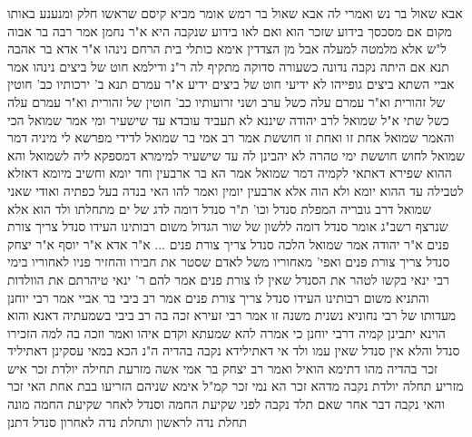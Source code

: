 \documentclass[12pt, openany]{book}
\begin{document}
{אבא שאול בר נש ואמרי לה אבא שאול בר רמש אומר  מביא קיסם שראשו חלק ומנענע באותו מקום  אם מסכסך בידוע שזכר הוא ואם לאו בידוע שנקבה היא 
א"ר נחמן אמר רבה בר אבוה ל"ש אלא מלמטה למעלה אבל מן הצדדין אימא  כותלי בית הרחם נינהו 
א"ר אדא בר אהבה  תנא אם היתה נקבה נדונה כשעורה סדוקה  מתקיף לה ר"נ  ודילמא חוט של ביצים נינהו  אמר אביי  השתא ביצים גופייהו לא ידיעי חוט של ביצים ידיע 
א"ר עמרם תנא  ב' ירכותיו כב' חוטין של זהורית  וא"ר עמרם עלה  כשל ערב  ושני זרועותיו כב' חוטין של זהורית וא"ר עמרם עלה  כשל שתי 
א"ל שמואל לרב יהודה  שיננא לא תעביד עובדא עד שישעיר  ומי אמר שמואל הכי  והאמר שמואל  אחת זו ואחת זו חוששת 
אמר רב אמי בר שמואל לדידי מפרשא לי מיניה דמר שמואל  לחוש חוששת ימי טהרה לא יהבינן לה עד שישעיר 
למימרא דמספקא ליה לשמואל  והא ההוא שפירא דאתאי לקמיה דמר שמואל  אמר  הא בר ארבעין וחד יומא וחשיב מיומא דאזלא לטבילה עד ההוא יומא ולא הוה אלא ארבעין יומין
ואמר להו  האי בנדה בעל  כפתיה ואודי  שאני שמואל דרב גובריה
המפלת סנדל וכו' ת"ר סנדל דומה לדג של ים מתחלתו ולד הוא אלא שנרצף  רשב"ג אומר  סנדל דומה ללשון של שור הגדול  משום רבותינו העידו  סנדל צריך צורת פנים 
א"ר יהודה אמר שמואל  הלכה סנדל צריך צורת פנים ... א"ר אדא א"ר יוסף א"ר יצחק  סנדל צריך צורת פנים ואפי' מאחוריו  משל לאדם שסטר את חבירו והחזיר פניו לאחוריו 
בימי רבי ינאי בקשו לטהר את הסנדל שאין לו צורת פנים אמר להם ר' ינאי  טיהרתם את הוולדות 
והתניא משום רבותינו העידו  סנדל צריך צורת פנים אמר רב ביבי בר אביי אמר רבי יוחנן  מעדותו של רבי נחוניא נשנית משנה זו  אמר רבי זעירא  זכה בה רב ביבי בשמעתיה דאנא והוא הוינא יתבינן קמיה דרבי יוחנן כי אמרה להא שמעתא וקדם איהו ואמר וזכה בה 
למה הזכירו סנדל והלא אין סנדל שאין עמו ולד 
אי דאתילידא נקבה בהדיה ה"נ הכא במאי עסקינן דאתיליד זכר בהדיה 
מהו דתימא הואיל ואמר רב יצחק בר אמי  אשה מזרעת תחילה יולדת זכר איש מזריע תחלה יולדת נקבה מדהא זכר הא נמי זכר
קמ"ל  אימא שניהם הזריעו בבת אחת האי זכר והאי נקבה 
דבר אחר  שאם תלד נקבה לפני שקיעת החמה וסנדל לאחר שקיעת החמה
מונה תחלת נדה לראשון ותחלת נדה לאחרון 
סנדל דתנן}
\end{document}
